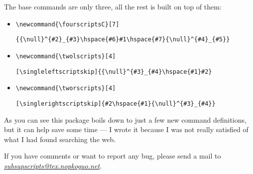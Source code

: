\documentclass[green,a4paper,oneside,openany,noparindent,noparskip,article,nomatter]{bookest}
\begin{document}
The base commands are only three, all the rest is built on top of them:

\begin{itemize}
\item\Verb+\newcommand{\fourscriptsC}[7]+

\hspace{4ex}\Verb+{{\null}^{#2}_{#3}\hspace{#6}#1\hspace{#7}{\null}^{#4}_{#5}}+

\item\Verb+\newcommand{\twolscripts}[4]+

\hspace{4ex}\Verb+[\singleleftscriptskip]{{\null}^{#3}_{#4}\hspace{#1}#2}+

\item\Verb+\newcommand{\tworscripts}[4]+

\hspace{4ex}\Verb+[\singlerightscriptskip]{#2\hspace{#1}{\null}^{#3}_{#4}}+
\end{itemize}

As you can see this package boils down to just a few new command definitions, but it can help save some time --- I wrote it because I was not really satisfied of what I had found searching the web.

\ppar
If you have comments or want to report any bug, please send a mail to \textsl{\href{mailto:subsupscripts@tex.nopkoguo.net}{subsupscripts@tex.nopkoguo.net}}.
\end{document}
